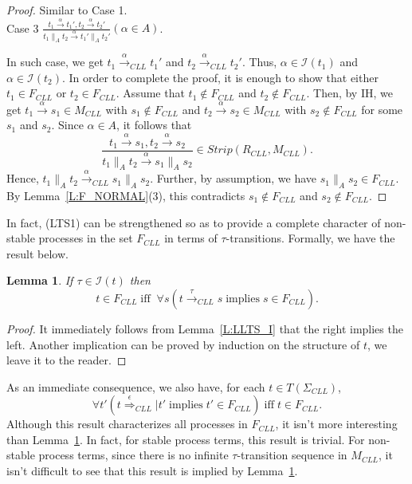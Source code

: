 \documentclass{elsarticle}
\theoremstyle{plain}
\newtheorem{lemma}[theorem]{Lemma}
\theoremstyle{definition}
\begin{document}
\begin{proof}
        Similar to Case 1.\\

       \noindent Case 3 $\frac{t_1 \stackrel{\alpha}{\longrightarrow} t_1',t_2 \stackrel{\alpha}{\longrightarrow} t_2'}{t_1 \parallel_A t_2 \stackrel{\alpha}{\longrightarrow} t_1' \parallel_A t_2'}( \alpha\in A) $.

        In such case, we get $t_1 \stackrel{\alpha}{\longrightarrow}_{CLL} t_1'$ and $t_2 \stackrel{\alpha}{\longrightarrow}_{CLL} t_2'$. Thus, $\alpha \in {\mathcal I}(t_1)$ and $\alpha \in {\mathcal I}(t_2)$. In order to complete the proof, it is enough to show that either $t_1 \in F_{CLL}$ or $t_2 \in F_{CLL}$.
        Assume that $t_1 \notin F_{{CLL}}$ and $t_2 \notin F_{{CLL}}$.
        Then, by IH, we get $t_1 \stackrel{\alpha}{\longrightarrow} s_1 \in  M_{{CLL}}$ with $s_1 \notin F_{{CLL}}$ and $t_2 \stackrel{\alpha}{\longrightarrow} s_2 \in  M_{{CLL}}$ with $s_2 \notin F_{{CLL}}$ for some $s_1$ and $s_2$.
        Since $\alpha \in A$, it follows that \[\frac{t_1 \stackrel{\alpha}{\longrightarrow} s_1,t_2 \stackrel{\alpha}{\longrightarrow} s_2}{t_1 \parallel_A t_2 \stackrel{\alpha}{\longrightarrow} s_1 \parallel_A s_2 } \in Strip(R_{CLL},M_{{CLL}}).\]
         Hence, $t_1 \parallel_A t_2 \stackrel{\alpha}{\longrightarrow}_{CLL} s_1 \parallel_A s_2 $.
         Further, by assumption, we have $s_1 \parallel_A s_2 \in F_{{CLL}}$.
         By Lemma~\ref{L:F_NORMAL}(3), this contradicts $s_1 \notin F_{{CLL}}$ and $s_2 \notin F_{{CLL}}$.
\end{proof}

In fact, (LTS1) can be strengthened so as to provide a complete character of non-stable processes in the set $F_{CLL}$ in terms of $\tau$-transitions.
Formally, we have the result below.

\begin{lemma}\label{L:F_TAU_I}
 If $\tau \in {\mathcal I}(t)$ then
  \[t \in F_{CLL} \;\text{iff}\;\; \forall s(t\stackrel{\tau}{\longrightarrow}_{CLL}s\;\text{implies}\; s\in F_{CLL}).\]
\end{lemma}
\begin{proof}
It immediately follows from Lemma~\ref{L:LLTS_I} that the right implies the left.
Another implication can be proved by induction on the structure of $t$, we leave it to the reader.
\end{proof}

As an immediate consequence, we also have, for each $t \in T(\Sigma_{CLL})$,
\[\forall t'(t \stackrel{\epsilon}{\Longrightarrow}_{{CLL}}|t' \;\text{implies}\; t' \in F_{{CLL}}) \;\text{iff}\; t \in F_{{CLL}}.\]
Although this result characterizes all processes in $F_{CLL}$, it isn't more interesting than Lemma~\ref{L:F_TAU_I}.
In fact, for stable process terms, this result is trivial.
For non-stable process terms, since there is no infinite $\tau$-transition sequence in $M_{CLL}$, it isn't difficult to see that this result is implied by Lemma~\ref{L:F_TAU_I}.
\end{document}
